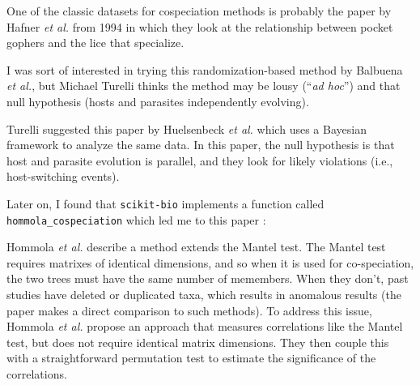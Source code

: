 One of the classic datasets for cospeciation methods is probably the paper by 
Hafner {\em et al.} from 1994 in which they look at the relationship between pocket
gophers and the lice that specialize. 


I was sort of interested in trying this randomization-based method by Balbuena 
{\em et al.}, but Michael Turelli thinks the method may be lousy (``{\em ad hoc}'') and 
that null hypothesis (hosts and parasites independently evolving).


Turelli suggested this paper by Huelsenbeck {\em et al.} which uses a Bayesian
framework to analyze the same data. In this paper, the null hypothesis is that
host and parasite evolution is parallel, and they look for likely violations
(i.e., host-switching events).


Later on, I found that {\tt scikit-bio} implements a function called {\tt hommola_cospeciation} %
which led me to this paper :


Hommola {\em et al.} describe a method extends the Mantel test. \cite{mantel1967detection} The Mantel test
requires matrixes of identical dimensions, and so when it is used for 
co-speciation, the two trees must have the same number of memembers. When
they don't, past studies have deleted or duplicated taxa, which results in
anomalous results (the paper makes a direct comparison to such methods).
To address this issue, Hommola {\em et al.} \cite{hommola2009permutation} propose an approach that measures
correlations like the Mantel test, but does not require identical matrix
dimensions. They then couple this with a straightforward permutation test 
to estimate the significance of the correlations.

